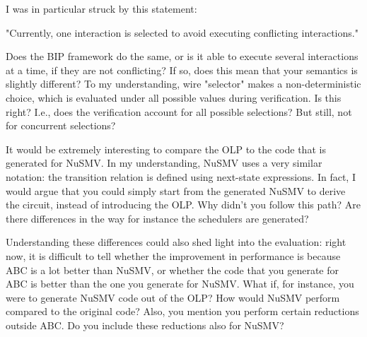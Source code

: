 I was in particular struck by this statement:

"Currently, one interaction is selected to avoid executing conflicting
interactions."

Does the BIP framework do the same, or is it able to execute several
interactions at a time, if they are not conflicting? If so, does this mean
that your semantics is slightly different? To my understanding, wire
"selector" makes a non-deterministic choice, which is evaluated under all
possible values during verification. Is this right? I.e., does the
verification account for all possible selections? But still, not for
concurrent selections?

\done
{}


It would be extremely interesting to compare the OLP to the code that is
generated for NuSMV. In my understanding, NuSMV uses a very similar notation:
the transition relation is defined using next-state expressions. In fact, I
would argue that you could simply start from the generated NuSMV to derive the
circuit, instead of introducing the OLP. Why didn't you follow this path? Are
there differences in the way for instance the schedulers are generated?

Understanding these differences could also shed light into the evaluation:
right now, it is difficult to tell whether the improvement in performance is
because ABC is a lot better than NuSMV, or whether the code that you generate
for ABC is better than the one you generate for NuSMV. What if, for instance,
you were to generate NuSMV code out of the OLP? How would NuSMV perform
compared to the original code? Also, you mention you perform certain
reductions outside ABC. Do you include these reductions also for NuSMV?


